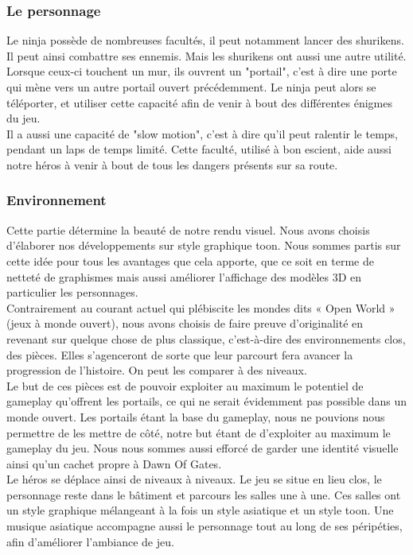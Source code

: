 \documentclass[12pt]{article}
\begin{document}
\subsubsection{Le personnage}

Le ninja possède de nombreuses facultés, il peut notamment lancer des shurikens. Il peut ainsi combattre ses ennemis. Mais les shurikens ont aussi une autre utilité. Lorsque ceux-ci touchent un mur, ils ouvrent un "portail", c'est à dire une porte qui mène vers un autre portail ouvert précédemment. Le ninja peut alors se téléporter, et utiliser cette capacité afin de venir à bout des différentes énigmes du jeu.\\
Il a aussi une capacité de "slow motion", c'est à dire qu'il peut ralentir le temps, pendant un laps de temps limité. Cette faculté, utilisé à bon escient, aide aussi notre héros à venir à bout de tous les dangers présents sur sa route.\\

\subsubsection{Environnement}

Cette partie détermine la beauté de notre rendu visuel. Nous avons choisis d'élaborer nos développements sur style graphique toon. Nous sommes partis sur cette idée pour tous les avantages que cela apporte, que ce soit en terme de netteté de graphismes mais aussi améliorer l'affichage des modèles 3D en particulier les personnages.\\
Contrairement au courant actuel qui plébiscite les mondes dits « Open World » (jeux à monde ouvert), nous avons choisis de faire preuve d'originalité en revenant sur quelque chose de plus classique, c'est-à-dire des environnements clos, des pièces. Elles s'agenceront de sorte que leur parcourt fera avancer la progression de l'histoire. On peut les comparer à des niveaux.\\
Le but de ces pièces est de pouvoir exploiter au maximum le potentiel de gameplay qu'offrent les portails, ce qui ne serait évidemment pas possible dans un monde ouvert. Les portails étant la base du gameplay, nous ne pouvions nous permettre de les mettre de côté, notre but étant de d'exploiter au maximum le gameplay du jeu. Nous nous sommes aussi efforcé de garder une identité visuelle ainsi qu'un cachet propre à Dawn Of Gates.\\
Le héros se déplace ainsi de niveaux à niveaux. Le jeu se situe en lieu clos, le personnage reste dans le bâtiment et parcours les salles une à une. Ces salles ont un style graphique mélangeant à la fois un style asiatique et un style toon. Une musique asiatique accompagne aussi le personnage tout au long de ses péripéties, afin d'améliorer l'ambiance de jeu.
\end{document}
